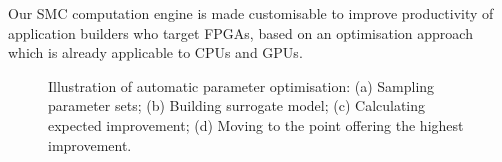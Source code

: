Our SMC computation engine is made customisable to improve productivity of application builders who target FPGAs, based on an optimisation approach which is already applicable to CPUs and GPUs. 

\setcounter{subfigure}{0}
\begin{figure}[t!]
\centering
{}
\caption{Illustration of automatic parameter optimisation: (a) Sampling parameter sets; (b) Building surrogate model; (c) Calculating expected improvement; (d) Moving to the point offering the highest improvement.}
\label{fig:dse}
\end{figure}


